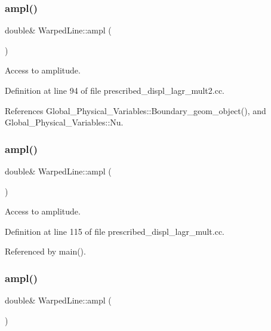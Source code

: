 \subsubsection{\texorpdfstring{ampl()}{ampl()}\hspace{0.1cm}{\footnotesize\ttfamily [1/3]}}
{\footnotesize\ttfamily double\& Warped\+Line\+::ampl (\begin{DoxyParamCaption}{ }\end{DoxyParamCaption})\hspace{0.3cm}{\ttfamily [inline]}}



Access to amplitude. 



Definition at line 94 of file prescribed\+\_\+displ\+\_\+lagr\+\_\+mult2.\+cc.



References Global\+\_\+\+Physical\+\_\+\+Variables\+::\+Boundary\+\_\+geom\+\_\+object(), and Global\+\_\+\+Physical\+\_\+\+Variables\+::\+Nu.

\mbox{\label{classWarpedLine_ae43c2f997b9c0de62783375341ac5794}} 
\subsubsection{\texorpdfstring{ampl()}{ampl()}\hspace{0.1cm}{\footnotesize\ttfamily [2/3]}}
{\footnotesize\ttfamily double\& Warped\+Line\+::ampl (\begin{DoxyParamCaption}{ }\end{DoxyParamCaption})\hspace{0.3cm}{\ttfamily [inline]}}



Access to amplitude. 



Definition at line 115 of file prescribed\+\_\+displ\+\_\+lagr\+\_\+mult.\+cc.



Referenced by main().

\mbox{\label{classWarpedLine_ae43c2f997b9c0de62783375341ac5794}} 
\subsubsection{\texorpdfstring{ampl()}{ampl()}\hspace{0.1cm}{\footnotesize\ttfamily [3/3]}}
{\footnotesize\ttfamily double\& Warped\+Line\+::ampl (\begin{DoxyParamCaption}{ }\end{DoxyParamCaption})\hspace{0.3cm}{\ttfamily [inline]}}



